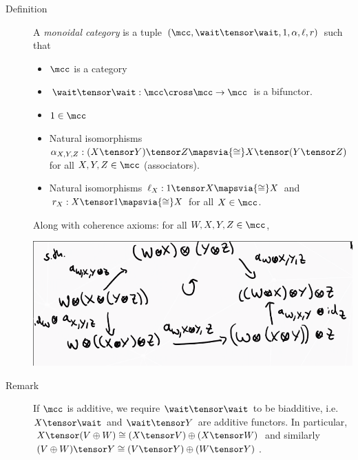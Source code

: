 \begin{description}
\item[Definition]
A \emph{monoidal category} is a tuple
\((\mcc, \wait \tensor \wait, 1, \alpha, \ell, r)\) such that

\begin{itemize}
\tightlist
\item
  \(\mcc\) is a category
\item
  \(\wait \tensor \wait: \mcc \cross \mcc \to \mcc\) is a bifunctor.
\item
  \(1\in \mcc\)
\item
  Natural isomorphisms
  \(\alpha_{X,Y,Z}: (X\tensor Y)\tensor Z \mapsvia{\cong} X\tensor (Y\tensor Z)\)
  for all \(X,Y,Z\in \mcc\) (associators).
\item
  Natural isomorphisms \(\ell_X: 1\tensor X \mapsvia{\cong} X\) and
  \(r_X:X\tensor 1 \mapsvia{\cong}X\) for all \(X\in \mcc\).
\end{itemize}

Along with coherence axioms: for all \(W,X,Y,Z\in \mcc\),

\includegraphics{figures/image_2020-07-13-11-09-53.png}

\begin{center}
\end{center}
\item[Remark]
If \(\mcc\) is additive, we require \(\wait \tensor \wait\) to be
biadditive, i.e.~\(X\tensor \wait\) and \(\wait \tensor Y\) are additive
functors. In particular,
\(X\tensor (V\oplus W) \cong (X\tensor V) \oplus (X\tensor W)\) and
similarly
\((V\oplus W) \tensor Y \cong (V\tensor Y) \oplus (W\tensor Y)\).
\end{description}

